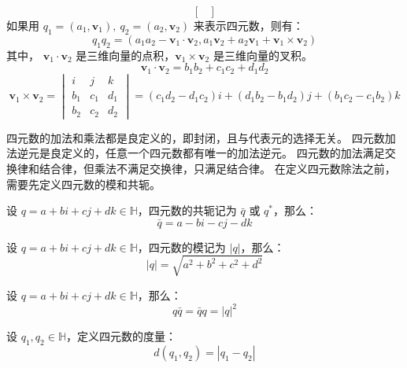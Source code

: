 \begin{definition}[四元数的乘法]
\[\begin{bmatrix}
        \end{bmatrix}
    \]
    如果用 $q_1 = (a_1, \mathbf{v}_1),\ q_2 = (a_2, \mathbf{v}_2)$ 来表示四元数，则有：
    \[
        q_1 q_2 = (a_1 a_2 - \mathbf{v}_1 \cdot \mathbf{v}_2, a_1 \mathbf{v}_2 + a_2 \mathbf{v}_1 + \mathbf{v}_1 \times \mathbf{v}_2)
    \]
    其中， $\mathbf{v}_1 \cdot \mathbf{v}_2$ 是三维向量的点积，$\mathbf{v}_1 \times \mathbf{v}_2$ 是三维向量的叉积。
    \[
        \mathbf{v}_1 \cdot \mathbf{v}_2 = b_1 b_2 + c_1 c_2 + d_1 d_2
    \]
    \[
        \mathbf{v}_1 \times \mathbf{v}_2 =
        \begin{vmatrix}
            i & j & k \\
            b_1 & c_1 & d_1 \\
            b_2 & c_2 & d_2
        \end{vmatrix}
        = (c_1 d_2 - d_1 c_2)i + (d_1 b_2 - b_1 d_2)j + (b_1 c_2 - c_1 b_2)k
    \]
\end{definition}
\vspace{1em}
\begin{note}
    四元数的加法和乘法都是良定义的，即封闭，且与代表元的选择无关。
    四元数加法逆元是良定义的，任意一个四元数都有唯一的加法逆元。
    四元数的加法满足交换律和结合律，但乘法不满足交换律，只满足结合律。
    在定义四元数除法之前，需要先定义四元数的模和共轭。
\end{note}
\vspace{1em}

\begin{definition}
    设 $q = a + bi + cj + dk\in\mathbb{H}$，四元数的共轭记为 $\bar{q}$ 或 $q^*$，那么：
    \[
        \bar{q} = a - bi - cj - dk
    \]
\end{definition}

\begin{definition}
    设 $q = a + bi + cj + dk\in\mathbb{H}$，四元数的模记为 $|q|$，那么：
    \[
        |q| = \sqrt{a^2 + b^2 + c^2 + d^2}
    \]
\end{definition}

\begin{proposition}[四元数的共轭与模的关系]
    设 $q = a + bi + cj + dk\in\mathbb{H}$，那么：
    \[
        q \bar{q} = \bar{q} q =  |q|^2
    \]
\end{proposition}

\begin{definition}[四元数的度量]
    设 $q_1, q_2\in\mathbb{H}$，定义四元数的度量：
    \[
        d(q_1, q_2) = |q_1 - q_2|
    \]
\end{definition}

